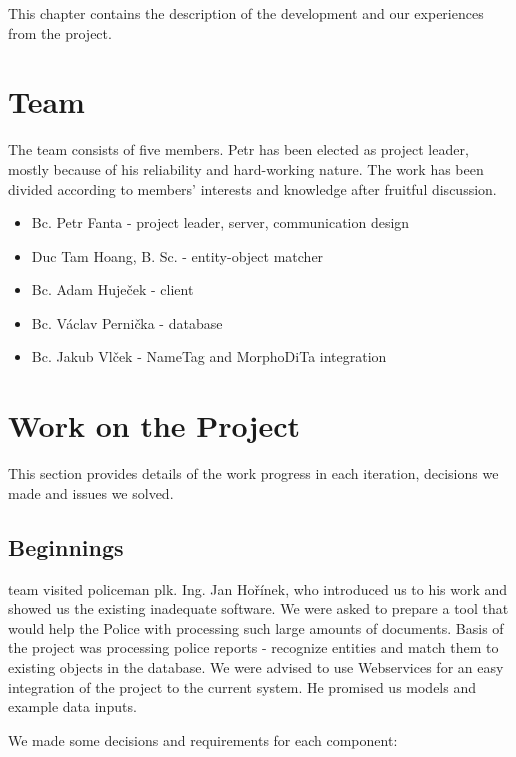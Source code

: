 This chapter contains the description of the development and our experiences from
the project.

\section{Team}

The team consists of five members. Petr has been elected as project leader,
mostly because of his reliability and hard-working nature. The work has been
divided according to members' interests and knowledge after fruitful discussion.

\begin{itemize}
\itemsep0em
\item Bc. Petr Fanta - project leader, server, communication design
\item Duc Tam Hoang, B. Sc. - entity-object matcher 
\item Bc. Adam Huječek - client
\item Bc. Václav Pernička - database
\item Bc. Jakub Vlček - NameTag and MorphoDiTa integration
\end{itemize}

\section{Work on the Project}

This section provides details of the work progress in each iteration, decisions
we made and issues we solved.

\subsection{Beginnings}
\textan{} team visited policeman plk. Ing. Jan Hořínek, who introduced us to his
work and showed us the existing inadequate software. We were asked to prepare
a tool that would help the Police with processing such large amounts of
documents. Basis of the project was processing police reports - recognize
entities and match them to existing objects in the database. We were advised to
use Webservices for an easy integration of the project to the current system. He
promised us models and example data inputs.


We made some decisions and requirements for each component:

